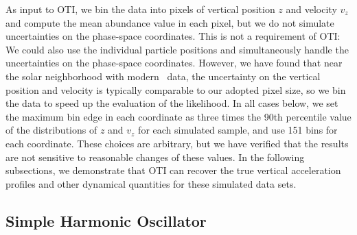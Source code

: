 As input to OTI, we bin the data into pixels of vertical position $z$ and velocity $v_z$
and compute the mean abundance value in each pixel, but we do not simulate uncertainties
on the phase-space coordinates.
This is not a requirement of OTI: We could also use the individual particle positions
and simultaneously handle the uncertainties on the phase-space coordinates.
However, we have found that near the solar neighborhood with modern \gaia\ data, the
uncertainty on the vertical position and velocity is typically comparable to our adopted
pixel size, so we bin the data to speed up the evaluation of the likelihood.
In all cases below, we set the maximum bin edge in each coordinate as three times the
90th percentile value of the distributions of $z$ and $v_z$ for each simulated sample,
and use 151 bins for each coordinate.
These choices are arbitrary, but we have verified that the results are not sensitive to
reasonable changes of these values.
In the following subsections, we demonstrate that OTI can recover the true vertical
acceleration profiles and other dynamical quantities for these simulated data sets.


\subsection{Simple Harmonic Oscillator}
\label{sec:sim-sho}


